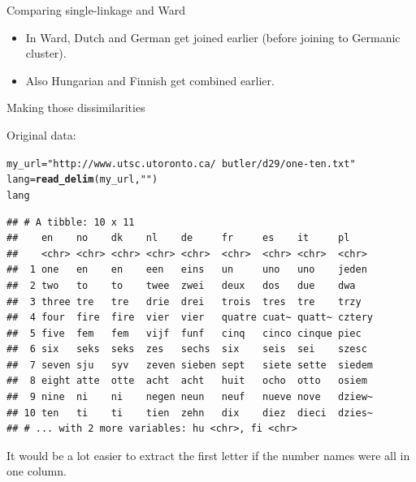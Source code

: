 \documentclass[unknownkeysallowed]{beamer}\usepackage[]{graphicx}\usepackage[]{color}
\makeatletter
\newcommand{\hlstr}[1]{\textcolor[rgb]{0.192,0.494,0.8}{#1}}%
\newcommand{\hlstd}[1]{\textcolor[rgb]{0.345,0.345,0.345}{#1}}%
\newcommand{\hlkwb}[1]{\textcolor[rgb]{0.69,0.353,0.396}{#1}}%
\newcommand{\hlkwd}[1]{\textcolor[rgb]{0.737,0.353,0.396}{\textbf{#1}}}%
\newenvironment{kframe}{%
 \def\at@end@of@kframe{}%
 \ifinner\ifhmode%
  \def\at@end@of@kframe{\end{minipage}}%
  \begin{minipage}{\columnwidth}%
 \fi\fi%
 \def\FrameCommand##1{\hskip\@totalleftmargin \hskip-\fboxsep
 \colorbox{shadecolor}{##1}\hskip-\fboxsep
     \hskip-\linewidth \hskip-\@totalleftmargin \hskip\columnwidth}%
 \MakeFramed {\advance\hsize-\width
   \@totalleftmargin\z@ \linewidth\hsize
   \@setminipage}}%
 {\par\unskip\endMakeFramed%
 \at@end@of@kframe}
\newenvironment{knitrout}{}{} %
\makeatother
\begin{document}
\begin{frame}[fragile]{Comparing single-linkage and Ward}

  \begin{itemize}
  \item In Ward, Dutch and German get joined earlier (before joining to Germanic cluster).
  \item Also Hungarian and Finnish get combined earlier.
  \end{itemize}
  
\end{frame}


\begin{frame}[fragile]{Making those dissimilarities}

Original data:




\begin{knitrout}\footnotesize
{}\color{fgcolor}\begin{kframe}
\begin{alltt}
\hlstd{my_url}\hlkwb{=}\hlstr{"http://www.utsc.utoronto.ca/~butler/d29/one-ten.txt"}
\hlstd{lang}\hlkwb{=}\hlkwd{read_delim}\hlstd{(my_url,}\hlstr{" "}\hlstd{)}
\hlstd{lang}
\end{alltt}
\begin{verbatim}
## # A tibble: 10 x 11
##    en    no    dk    nl    de     fr     es    it     pl    
##    <chr> <chr> <chr> <chr> <chr>  <chr>  <chr> <chr>  <chr> 
##  1 one   en    en    een   eins   un     uno   uno    jeden 
##  2 two   to    to    twee  zwei   deux   dos   due    dwa   
##  3 three tre   tre   drie  drei   trois  tres  tre    trzy  
##  4 four  fire  fire  vier  vier   quatre cuat~ quatt~ cztery
##  5 five  fem   fem   vijf  funf   cinq   cinco cinque piec  
##  6 six   seks  seks  zes   sechs  six    seis  sei    szesc 
##  7 seven sju   syv   zeven sieben sept   siete sette  siedem
##  8 eight atte  otte  acht  acht   huit   ocho  otto   osiem 
##  9 nine  ni    ni    negen neun   neuf   nueve nove   dziew~
## 10 ten   ti    ti    tien  zehn   dix    diez  dieci  dzies~
## # ... with 2 more variables: hu <chr>, fi <chr>
\end{verbatim}
\end{kframe}
\end{knitrout}

It would be a lot easier to extract the first letter if the number
names were all in one column.
  
\end{frame}
\end{document}
